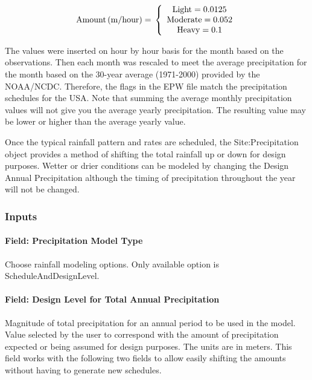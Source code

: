 \begin{equation}
\rm{Amount} \, (m/hour) = \, \left\{
  \begin{array}{*{20}{c}}
    \rm{Light} = 0.0125 \\
    \rm{Moderate} = 0.052 \\
    \rm{Heavy} = 0.1
  \end{array}
\right.
\end{equation}

The values were inserted on hour by hour basis for the month based on the observations. Then each month was rescaled to meet the average precipitation for the month based on the 30-year average (1971-2000) provided by the NOAA/NCDC. Therefore, the flags in the EPW file match the precipitation schedules for the USA. Note that summing the average monthly precipitation values will not give you the average yearly precipitation. The resulting value may be lower or higher than the average yearly value.

Once the typical rainfall pattern and rates are scheduled, the Site:Precipitation object provides a method of shifting the total rainfall up or down for design purposes. Wetter or drier conditions can be modeled by changing the Design Annual Precipitation although the timing of precipitation throughout the year will not be changed.

\subsubsection{Inputs}\label{inputs-22-002}

\paragraph{Field: Precipitation Model Type}\label{field-precipitation-model-type}

Choose rainfall modeling options. Only available option is ScheduleAndDesignLevel.

\paragraph{Field: Design Level for Total Annual Precipitation}\label{field-design-level-for-total-annual-precipitation}

Magnitude of total precipitation for an annual period to be used in the model. Value selected by the user to correspond with the amount of precipitation expected or being assumed for design purposes. The units are in meters. This field works with the following two fields to allow easily shifting the amounts without having to generate new schedules.

